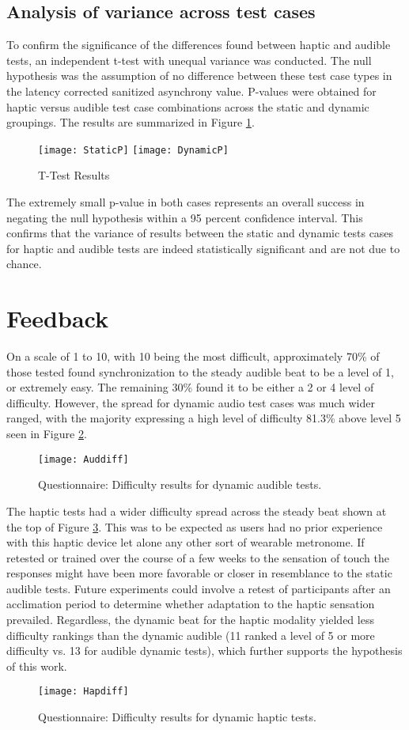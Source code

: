 \subsection{Analysis of variance across test cases}

To confirm the significance of the differences found between haptic and audible tests, an independent t-test with unequal variance was conducted. The null hypothesis was the assumption of no difference between these test case types in the latency corrected sanitized asynchrony value. P-values were obtained for haptic versus audible test case combinations across the static and dynamic groupings. The results are summarized in Figure \ref{fig:pvalue}.
\begin{figure}[H]
    \centering
    \texttt{[image: StaticP]}
    \texttt{[image: DynamicP]}
    \caption{T-Test Results}
    \label{fig:pvalue}
\end{figure}
The extremely small p-value in both cases represents an overall success in negating the null hypothesis within a 95 percent confidence interval. This confirms that the variance of results between the static and dynamic tests cases for haptic and audible tests are indeed statistically significant and are not due to chance.

\section{Feedback}
On a scale of 1 to 10, with 10 being the most difficult, approximately 70\% of those tested found synchronization to the steady audible beat to be a level of 1, or extremely easy. The remaining 30\% found it to be either a 2 or 4 level of difficulty. However, the spread for dynamic audio test cases was much wider ranged, with the majority expressing a high level of difficulty 81.3\% above level 5 seen in Figure \ref{fig:Auddiff}. 
\begin{figure}[H]
    \centering
    \texttt{[image: Auddiff]}
    \caption{Questionnaire: Difficulty results for dynamic audible tests.}
    \label{fig:Auddiff}
\end{figure}
The haptic tests had a wider difficulty spread across the steady beat shown at the top of Figure \ref{fig:Hapdiff}. This was to be expected as users had no prior experience with this haptic device let alone any other sort of wearable metronome. If retested or trained over the course of a few weeks to the sensation of touch the responses might have been more favorable or closer in resemblance to the static audible tests. Future experiments could involve a retest of participants after an acclimation period to determine whether adaptation to the haptic sensation prevailed. Regardless, the dynamic beat for the haptic modality yielded less difficulty rankings than the dynamic audible (11 ranked a level of 5 or more difficulty vs. 13 for audible dynamic tests), which further supports the hypothesis of this work.
\begin{figure}[H]
    \centering
    \texttt{[image: Hapdiff]}
    \caption{Questionnaire: Difficulty results for dynamic haptic tests.}
    \label{fig:Hapdiff}
\end{figure}

